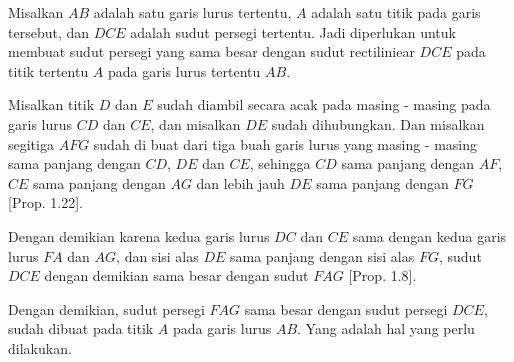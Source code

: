 \documentclass[a4paper]{book}
\begin{document}
\begin{center}
\end{center}

Misalkan $AB$ adalah satu garis lurus tertentu, $A$ adalah satu titik pada 
garis tersebut, dan $DCE$ adalah sudut persegi tertentu. Jadi diperlukan
untuk membuat sudut persegi yang sama besar dengan sudut rectiliniear
$DCE$ pada titik tertentu $A$ pada garis lurus tertentu $AB$.

Misalkan titik $D$ dan $E$ sudah diambil secara acak pada masing - masing
pada garis lurus $CD$ dan $CE$, dan misalkan $DE$ sudah dihubungkan. 
Dan misalkan segitiga $AFG$ sudah di buat dari tiga buah garis lurus yang 
masing - masing sama panjang dengan $CD$, $DE$ dan $CE$, sehingga $CD$ sama
panjang dengan $AF$, $CE$ sama panjang dengan $AG$ dan lebih jauh $DE$ 
sama panjang dengan $FG$ [Prop. 1.22].

Dengan demikian karena kedua garis lurus $DC$ dan $CE$ sama dengan kedua
garis lurus $FA$ dan $AG$, dan sisi alas $DE$ sama panjang dengan sisi
alas $FG$, sudut $DCE$ dengan demikian sama besar dengan 
sudut $FAG$ [Prop. 1.8].

Dengan demikian, sudut persegi $FAG$ sama besar dengan sudut persegi
$DCE$, sudah dibuat pada titik $A$ pada garis lurus $AB$. Yang adalah hal
yang perlu dilakukan.

\end{document}
